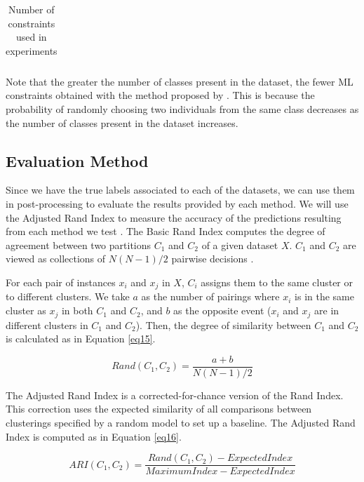 \documentclass[review]{elsarticle}
\begin{document}
\begin{table}[!h]
{\begin{tabular}{lcc c cc c cc c cc}
	\end{tabular}}

	\caption{Number of constraints used in experiments}
	\label{tab:constraints}
\end{table}

Note that the greater the number of classes present in the dataset, the fewer ML constraints obtained with the method proposed by \cite{wagstaff2001constrained}. This is because the probability of randomly choosing two individuals from the same class decreases as the number of classes present in the dataset increases.

\clearpage

\subsection{Evaluation Method}

Since we have the true labels associated to each of the datasets, we can use them in post-processing to evaluate the results provided by each method. We will use the Adjusted Rand Index to measure the accuracy of the predictions resulting from each method we test \cite{hubert1985comparing}. The Basic Rand Index computes the degree of agreement between two partitions $C_1$ and $C_2$ of a given dataset $X$. $C_1$ and $C_2$ are viewed as collections of $N(N - 1)/2$ pairwise decisions \cite{rand1971objective}.

For each pair of instances $x_i$ and $x_j$ in $X$, $C_i$ assigns them to the same cluster or to different clusters. We take $a$ as the number of pairings where $x_i$ is in the same cluster as $x_j$ in both $C_1$ and $C_2$, and $b$ as the opposite event ($x_i$ and $x_j$ are in different clusters in $C_1$ and $C_2$). Then, the degree of similarity between $C_1$ and $C_2$ is calculated as in Equation \eqref{eq15}.

\begin{equation}
Rand(C_1, C_2) = \frac{a + b}{N(N - 1)/2}
\label{eq15}
\end{equation}

The Adjusted Rand Index is a corrected-for-chance version of the Rand Index. This correction uses the expected similarity of all comparisons between clusterings specified by a random model to set up a baseline. The Adjusted Rand Index is computed as in Equation \eqref{eq16}.

\begin{equation}
ARI(C_1, C_2) = \frac{Rand(C_1, C_2) - ExpectedIndex}{MaximumIndex - ExpectedIndex}
\label{eq16}
\end{equation}
\end{document}
